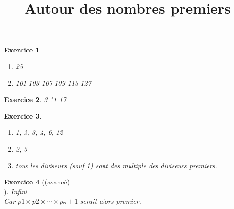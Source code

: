 \documentclass[a4paper]{article}
\title{Autour des nombres premiers}
\date{}
\theoremstyle{exostyle}
\newtheorem{exercice}{Exercice}
\begin{document}
\maketitle

\begin{exercice}
	\begin{enumerate}
		\item 25
		\item 101 103 107 109 113 127
	\end{enumerate}
\end{exercice}

\begin{exercice}
	3 11 17
\end{exercice}

\begin{exercice}
	\begin{enumerate}
		\item 1, 2, 3, 4, 6, 12
		\item 2, 3
		\item tous les diviseurs (sauf 1) sont des multiple des diviseurs premiers.
	\end{enumerate}
\end{exercice}

\begin{exercice}[(avancé)\\]
	Infini \\
	Car $p1×p2×⋯×pₙ + 1$ serait alors premier.
\end{exercice}
\end{document}
